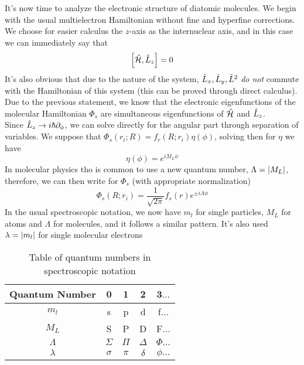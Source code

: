 \documentclass[../qm.tex]{subfiles}
\begin{document}
	It's now time to analyze the electronic structure of diatomic molecules. We begin with the usual multielectron Hamiltonian without fine and hyperfine corrections. We choose for easier calculus the $z$-axis as the internuclear axis, and in this case we can immediately say that
	\begin{equation*}
		\comm{\opr{\ham}}{\opr{L}_z}=0
	\end{equation*}
	It's also obvious that due to the nature of the system, $\hat{L}_x,\hat{L}_y,\hat{L}^2$ \emph{do not} commute with the Hamiltonian of this system (this can be proved through direct calculus). Due to the previous statement, we know that the electronic eigenfunctions of the molecular Hamiltonian $\Phi_s$ are simultaneous eigenfunctions of $\hat{\mathcal{H}}$ and $\hat{L}_z$.\\
	Since $\hat{L}_z\to i\hbar\partial_{\phi}$, we can solve directly for the angular part through separation of variables. We suppose that $\Phi_s(r_i;R)=f_r(R;r_i)\eta(\phi)$, solving then for $\eta$ we have \begin{equation}
		\eta(\phi)=e^{iM_L\phi}
		\label{eq:angularpart}
	\end{equation}
	In molecular physics tho is common to use a new quantum number, $\Lambda=\abs{M_L}$, therefore, we can then write for $\Phi_s$ (with appropriate normalization)
	\begin{equation}
		\Phi_s(R;r_i)=\frac{1}{\sqrt{2\pi}}f_s(r)e^{\pm i\Lambda\phi}
		\label{eq:electronicwavefunction}
	\end{equation}
	In the usual spectroscopic notation, we now have $m_l$ for single particles, $M_L$ for atoms and $\Lambda$ for molecules, and it follows a similar pattern. It's also used $\lambda=\abs{m_l}$ for single molecular electrons
	\begin{table}[H]
		\centering
		\begin{tabular}{|c|c|c|c|c}
			\hline
			Quantum Number&0&1&2&3$\ldots$\\
			\hline
			$m_l$&s&p&d&f$\ldots$\\
			\hline
			$M_L$&S&P&D&F$\ldots$\\
			\hline
			$\Lambda$&$\Sigma$&$\Pi$&$\Delta$&$\Phi\ldots$\\
			\hline
			$\lambda$&$\sigma$&$\pi$&$\delta$&$\phi\ldots$\\
			\hline
		\end{tabular}
		\caption{Table of quantum numbers in spectroscopic notation}
		\label{tab:quantumnumbers}
	\end{table}
\end{document}
